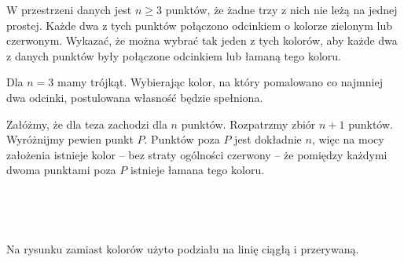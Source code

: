 \begin{problem}{4}
	W przestrzeni danych jest $n \geqslant 3$ punktów, że żadne trzy z nich nie leżą na jednej prostej. Każde dwa z tych punktów połączono odcinkiem o kolorze zielonym lub czerwonym. Wykazać, że można wybrać tak jeden z tych kolorów, aby każde dwa z danych punktów były połączone odcinkiem lub łamaną tego koloru.
\end{problem}

\noindent
Dla $n = 3$ mamy trójkąt. Wybierając kolor, na który pomalowano co najmniej dwa odcinki, postulowana własność będzie spełniona.
\vspace{10px}

\noindent
Załóżmy, że dla teza zachodzi dla $n$ punktów. Rozpatrzmy zbiór $n + 1$ punktów. Wyróżnijmy pewien punkt $P$. Punktów poza $P$ jest dokładnie $n$, więc na mocy założenia istnieje kolor -- bez straty ogólności czerwony -- że pomiędzy każdymi dwoma punktami poza $P$ istnieje łamana tego koloru. 

\begin{minipage}{0.5\textwidth}
\begin{center}
\\

\end{center}
\end{minipage}
\begin{minipage}{0.5\textwidth}
\begin{center}
\\
\end{center}
\end{minipage}
\begin{center}
Na rysunku zamiast kolorów użyto podziału na linię ciągłą i przerywaną.
\end{center}

